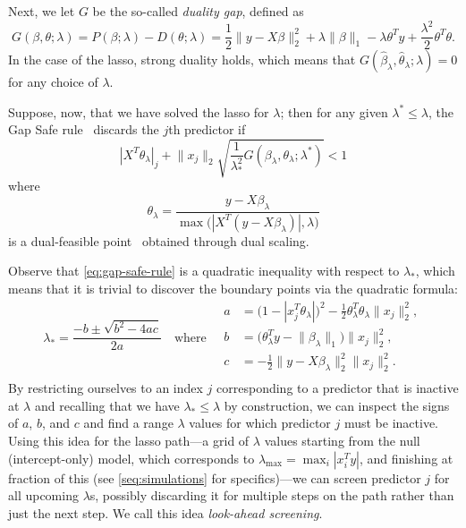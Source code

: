 \documentclass[b5paper,10pt,abstractoff,DIV=calc,headings=normal,twoside]{scrartcl}
\theoremstyle{plain}
\theoremstyle{definition}
\theoremstyle{remark}
\begin{document}
Next, we let \(G\) be the so-called \emph{duality gap}, defined as
\begin{equation}
  G(\beta, \theta; \lambda)
  = P(\beta; \lambda) - D(\theta; \lambda)
  =
  \frac 12 \lVert y - X\beta\rVert_2^2 + \lambda \lVert \beta \rVert_1
  - \lambda \theta^T y + \frac{\lambda^2}{2} \theta^T \theta.
\end{equation}
In the case of the lasso, strong duality holds, which means that
\(G(\hat\beta_\lambda, \hat\theta_\lambda; \lambda) = 0\) for any
choice of \(\lambda\).

Suppose, now, that we have solved the lasso for \(\lambda\); then
for any given \(\lambda^* \leq \lambda\),
the Gap Safe rule~\citep{ndiaye2017} discards the \(j\)th
predictor if
\begin{equation} \label{eq:gap-safe-rule}
  |X^T \theta_\lambda|_j + \lVert x_j\rVert_2
  \sqrt{\frac{1}{\lambda_*^2}
    G(\beta_\lambda, \theta_\lambda; \lambda^*)}
  < 1
\end{equation}
where
\[
  \theta_\lambda = \frac{y - X\beta_\lambda}{
    \max\big( |X^T(y - X\beta_\lambda)|, \lambda\big)}
\]
is a dual-feasible point~\cite{ndiaye2017} obtained through dual scaling.

Observe that \eqref{eq:gap-safe-rule} is a quadratic inequality with
respect to \(\lambda_*\), which
means that it is trivial to discover the boundary points via the
quadratic formula:
\[
  \lambda_* = \frac{-b \pm \sqrt{b^2 - 4ac}}{2a} \quad \text{where} \quad
  \begin{aligned}
    a & = \big( 1 - | x_j^T \theta_\lambda|\big)^2 -
    \frac 12 \theta_\lambda^T \theta_\lambda \lVert x_j\rVert_2^2,      \\
    b & = \big(\theta_\lambda^T y - \lVert \beta_\lambda \rVert_1\big)
    \lVert x_j \rVert_2^2,                                                          \\
    c & = - \frac 12 \lVert y - X\beta_\lambda\rVert_2^2
    \lVert x_j\rVert_2^2.                                                          \\
  \end{aligned}
\]
By restricting ourselves to an index \(j\) corresponding to a predictor that is
inactive at \(\lambda\) and recalling that we have \(\lambda_* \leq \lambda\) by
construction, we can inspect the signs of \(a\), \(b\), and \(c\) and find a
range \(\lambda\) values for which predictor \(j\) must be inactive. Using this
idea for the lasso path---a grid of \(\lambda\) values starting from the null
(intercept-only) model, which corresponds to \(\lambda_\text{max} =
\max_i|x_i^Ty|\), and finishing at fraction of this (see
\autoref{seq:simulations} for specifics)---we can screen predictor \(j\) for all
upcoming \(\lambda\)s, possibly discarding it for multiple steps on the path
rather than just the next step. We call this idea \emph{look-ahead screening}.
\end{document}
